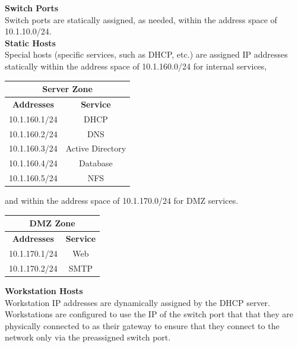 \noindent
\textbf{Switch Ports} \\
Switch ports are statically assigned, as needed, within the address space of 
10.1.10.0/24. \\

\noindent
\textbf{Static Hosts} \\
Special hosts (specific services, such as DHCP, etc.) are assigned IP addresses 
statically within the address space of 10.1.160.0/24 for internal services, \\

\begin{center}
	\begin{tabular}[m]{| c | c |}
		\hline
		\multicolumn{2}{|c|}{Server Zone}\\
		\hline
		\textbf{Addresses} & \textbf{Service}\\
		\hline
		10.1.160.1/24 & DHCP \\
		\hline
		10.1.160.2/24 & DNS \\
		\hline
		10.1.160.3/24 & Active Directory \\
		\hline
		10.1.160.4/24 & Database \\
		\hline
		10.1.160.5/24 & NFS \\
		\hline
	\end{tabular}
\end{center}

\vspace{1em}

and within the address space of 10.1.170.0/24 for DMZ services. \\

\begin{center}
	\begin{tabular}[m]{| c | c |}
		\hline
		\multicolumn{2}{|c|}{DMZ Zone}\\
		\hline
		\textbf{Addresses} & \textbf{Service}\\
		\hline
		10.1.170.1/24 & Web \\
		\hline
		10.1.170.2/24 & SMTP \\
		\hline
	\end{tabular}
\end{center}

\vspace{1em}

\noindent
\textbf{Workstation Hosts} \\
Workstation IP addresses are dynamically assigned by the DHCP server. 
Workstations are configured to use the IP of the switch port that that they are
physically connected to as their gateway to ensure that they connect to the 
network only via the preassigned switch port. \\

